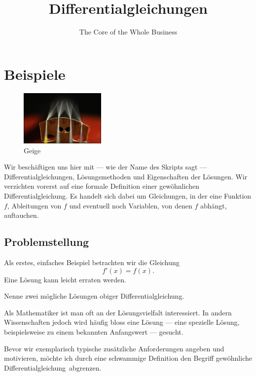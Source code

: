 \documentclass[%
11pt,%
twoside,%
titlepage,%
german,%
headsepline%
]{scrartcl}
\title{Differentialgleichungen}
\subtitle{The Core of the Whole Business}
\author{}
\date{}
\begin{document}
\maketitle
\tableofcontents
\cleardoublepage

\section{Beispiele}

\begin{figure}
\vspace{-0pt}
  \begin{center}
    \includegraphics[width=0.37\textwidth]{pictures/geige}
  \end{center}
\caption{Geige}
\end{figure}
Wir besch\"aftigen uns hier mit --- wie der Name des Skripts sagt --- Differentialgleichungen, L\"osungsmethoden und Eigenschaften der L\"osungen. Wir verzichten vorerst auf eine formale Definition einer \glqq gew\"ohnlichen Differentialgleichung\grqq. Es handelt sich dabei um Gleichungen, in der eine Funktion $f$, Ableitungen von $f$ und eventuell noch Variablen, von denen $f$ abh\"angt, auftauchen.

\subsection{Problemstellung}

Als erstes, einfaches Beispiel betrachten wir die Gleichung
$$f'(x)=f(x).$$
Eine L\"osung kann leicht erraten werden.

\begin{ueb}
Nenne zwei m\"ogliche L\"osungen obiger Differentialgleichung.
\end{ueb}

Als Mathematiker ist man oft an der L\"osungsvielfalt interessiert. In andern Wissenschaften jedoch wird h\"aufig bloss eine L\"osung --- eine spezielle L\"osung, beispielsweise zu einem bekannten Anfangswert --- gesucht.

Bevor wir exemplarisch typische zus\"atzliche Anforderungen angeben und motivieren, m\"ochte ich durch eine schwammige Definition den  Begriff \glqq gew\"ohnliche Differentialgleichung\grqq\ abgrenzen.
\end{document}
